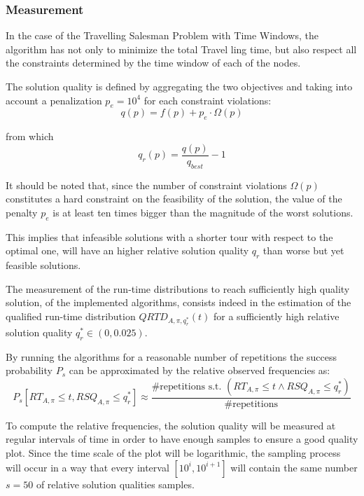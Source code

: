 \subsubsection{Measurement}\label{subsec:measure}
In the case of the Travelling Salesman Problem with Time Windows, the algorithm has not only to minimize the total Travel ling time, but also respect all the constraints determined by the time window of each of the nodes.

The solution quality is defined by aggregating the two objectives and taking into account a penalization $p_e = 10^4$ for each constraint violations:
\begin{equation}
  q(p) = f(p) + p_e \cdot\Omega(p)
\end{equation}

from which
\begin{equation}
  q_r(p) = \frac{q(p)}{q_{best}} - 1
\end{equation}

It should be noted that, since the number of constraint violations $\Omega(p)$ constitutes a hard constraint on the feasibility of the solution, the value of the penalty $p_e$ is at least ten times bigger than the magnitude of the worst solutions.

This implies that infeasible solutions with a shorter tour with respect to the optimal one, will have an higher relative solution quality $q_r$ than worse but yet feasible solutions.

The measurement of the run-time distributions to reach sufficiently high quality solution, of the implemented algorithms, consists indeed in the estimation of the qualified run-time distribution $QRTD_{A,\pi,q_r^{*}}(t)$ for a sufficiently high relative solution quality $q_r^{*} \in (0,0.025)$.

By running the algorithms for a reasonable number of repetitions the success probability $P_s$ can be approximated by the relative observed frequencies as:
\begin{equation}
P_s[RT_{A,\pi} \le t,RSQ_{A,\pi} \le q_r^{*}] \approx \frac{\text{\#repetitions s.t. } (RT_{A,\pi} \le t \wedge RSQ_{A,\pi} \le q_r^{*})}{\text{\#repetitions}}   
\end{equation}

To compute the relative frequencies, the solution quality will be measured at regular intervals of time in order to have enough samples to ensure a good quality plot.
Since the time scale of the plot will be logarithmic, the sampling process will occur in a way that every interval $[10^i,10^{i+1}]$ will contain the same number $s=50$ of relative solution qualities samples.

